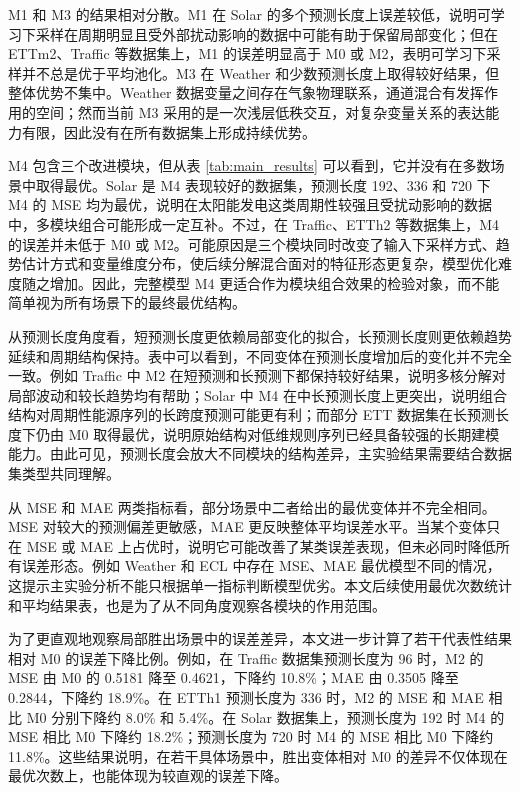 M1 和 M3 的结果相对分散。M1 在 Solar 的多个预测长度上误差较低，说明可学习下采样在周期明显且受外部扰动影响的数据中可能有助于保留局部变化；但在 ETTm2、Traffic 等数据集上，M1 的误差明显高于 M0 或 M2，表明可学习下采样并不总是优于平均池化。M3 在 Weather 和少数预测长度上取得较好结果，但整体优势不集中。Weather 数据变量之间存在气象物理联系，通道混合有发挥作用的空间；然而当前 M3 采用的是一次浅层低秩交互，对复杂变量关系的表达能力有限，因此没有在所有数据集上形成持续优势。

M4 包含三个改进模块，但从表 \ref{tab:main_results} 可以看到，它并没有在多数场景中取得最优。Solar 是 M4 表现较好的数据集，预测长度 192、336 和 720 下 M4 的 MSE 均为最优，说明在太阳能发电这类周期性较强且受扰动影响的数据中，多模块组合可能形成一定互补。不过，在 Traffic、ETTh2 等数据集上，M4 的误差并未低于 M0 或 M2。可能原因是三个模块同时改变了输入下采样方式、趋势估计方式和变量维度分布，使后续分解混合面对的特征形态更复杂，模型优化难度随之增加。因此，完整模型 M4 更适合作为模块组合效果的检验对象，而不能简单视为所有场景下的最终最优结构。

从预测长度角度看，短预测长度更依赖局部变化的拟合，长预测长度则更依赖趋势延续和周期结构保持。表中可以看到，不同变体在预测长度增加后的变化并不完全一致。例如 Traffic 中 M2 在短预测和长预测下都保持较好结果，说明多核分解对局部波动和较长趋势均有帮助；Solar 中 M4 在中长预测长度上更突出，说明组合结构对周期性能源序列的长跨度预测可能更有利；而部分 ETT 数据集在长预测长度下仍由 M0 取得最优，说明原始结构对低维规则序列已经具备较强的长期建模能力。由此可见，预测长度会放大不同模块的结构差异，主实验结果需要结合数据集类型共同理解。

从 MSE 和 MAE 两类指标看，部分场景中二者给出的最优变体并不完全相同。MSE 对较大的预测偏差更敏感，MAE 更反映整体平均误差水平。当某个变体只在 MSE 或 MAE 上占优时，说明它可能改善了某类误差表现，但未必同时降低所有误差形态。例如 Weather 和 ECL 中存在 MSE、MAE 最优模型不同的情况，这提示主实验分析不能只根据单一指标判断模型优劣。本文后续使用最优次数统计和平均结果表，也是为了从不同角度观察各模块的作用范围。

为了更直观地观察局部胜出场景中的误差差异，本文进一步计算了若干代表性结果相对 M0 的误差下降比例。例如，在 Traffic 数据集预测长度为 96 时，M2 的 MSE 由 M0 的 0.5181 降至 0.4621，下降约 10.8\%；MAE 由 0.3505 降至 0.2844，下降约 18.9\%。在 ETTh1 预测长度为 336 时，M2 的 MSE 和 MAE 相比 M0 分别下降约 8.0\% 和 5.4\%。在 Solar 数据集上，预测长度为 192 时 M4 的 MSE 相比 M0 下降约 18.2\%；预测长度为 720 时 M4 的 MSE 相比 M0 下降约 11.8\%。这些结果说明，在若干具体场景中，胜出变体相对 M0 的差异不仅体现在最优次数上，也能体现为较直观的误差下降。

